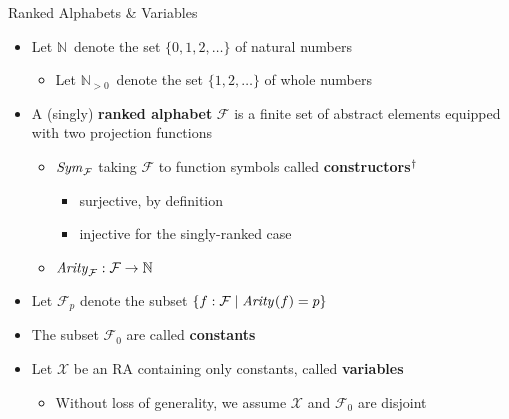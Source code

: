 \documentclass[pdf,fyma2]{prosper} %
\newcommand{\var}[1]{\ensuremath{\text{\textrm{\textit{#1}}}}}
\newcommand{\NAT}{\ensuremath{\mathbb{N}}}
\newcommand{\WHOLE}{\ensuremath{\mathbb{N}_{{>}0}}}
\newcommand{\SYM}[1][]{\ensuremath{\var{Sym}_{#1}}}
\newcommand{\ARITY}[1][]{\ensuremath{\var{Arity}_{#1}}}
\newcommand{\defn}[1]{\textbf{#1}}
\begin{document}
\begin{slide}{Ranked Alphabets \& Variables}
	\vspace{1em}
	\begin{itemize}
	\item Let \NAT\ denote the set $\{0,1,2,\ldots\}$ of natural numbers
	    \begin{itemize}
	    \item Let \WHOLE\ denote the set $\{1,2,\ldots\}$ of whole numbers
	    \end{itemize}
	\vspace{1em}
	\item A (singly) \defn{ranked alphabet} $\mathcal{F}$ is a finite set of abstract elements equipped with two projection functions
	    \begin{itemize}
	    \item $\SYM[\mathcal{F}]$ taking $\mathcal{F}$ to function symbols called \defn{constructors}$\null^\dagger$
	        \begin{itemize}
	        \item surjective, by definition
	        \item injective for the singly-ranked case
	        \end{itemize}
	    \item $\ARITY[\mathcal{F}] : \mathcal{F} \to \NAT$
	    \end{itemize}
    \item Let $\mathcal{F}_p$ denote the subset $\{ f : \mathcal{F} \mid \ARITY(f) = p \}$
    \item The subset $\mathcal{F}_0$ are called \defn{constants}
	\vspace{1.5em}
	\item Let $\mathcal{X}$ be an RA containing only constants, called \defn{variables}
        \begin{itemize}
        \item Without loss of generality, we assume $\mathcal{X}$ and $\mathcal{F}_0$ are disjoint
        \end{itemize}
	\end{itemize}
\end{slide}
\end{document}

